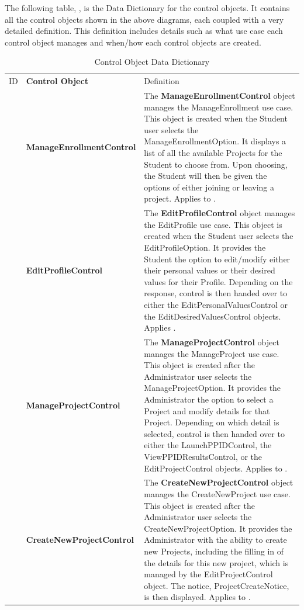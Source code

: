 \documentclass[12pt,letterpaper]{article}
\begin{document}
The following table, , is the Data Dictionary for the control objects. It contains all the control objects shown in the above diagrams, each coupled with a very detailed definition. 
This definition includes details such as what use case each control object manages and when/how each control objects are created.

\begin{table}[H]
\caption{Control Object Data Dictionary}
	\begin{tabu} to 
		\tableheader{}ID & Control Object & Definition\\
		 & Manage\-Enrollment\-Control & 
			The {\bf ManageEnrollmentControl} object manages the ManageEnrollment use case. This object is created when the Student user selects the ManageEnrollmentOption.  It displays a list of all the available Projects for the Student to choose from. Upon choosing, the Student will then be given the options of either joining or leaving a project. Applies to . \\
		
		 & Edit\-Profile\-Control & 
			The {\bf EditProfileControl} object manages the EditProfile use case. This object is created when the Student user selects the EditProfileOption. It provides the Student the option to edit/modify either their personal values or their desired values for their Profile. Depending on the response, control is then handed over to either the EditPersonalValuesControl or the EditDesiredValuesControl objects. Applies . \\
		
		 & Manage\-Project\-Control & 
			The {\bf ManageProjectControl} object manages the ManageProject use case. This object is created after the Administrator user selects the ManageProjectOption. It provides the Administrator the option to select a Project and modify details for that Project. Depending on which detail is selected, control is then handed over to either the LaunchPPIDControl, the ViewPPIDResultsControl, or the EditProjectControl objects. Applies to . \\
		
		 & Create\-New\-Project\-Control & 
			The {\bf CreateNewProjectControl} object manages the CreateNewProject use case. This object is created after the Administrator user selects the CreateNewProjectOption. It provides the Administrator with the ability to create new Projects, including the filling in of the details for this new project, which is managed by the EditProjectControl object. The notice, ProjectCreateNotice, is then displayed. Applies to . \\
		

\end{tabu}
\end{table}
\end{document}
